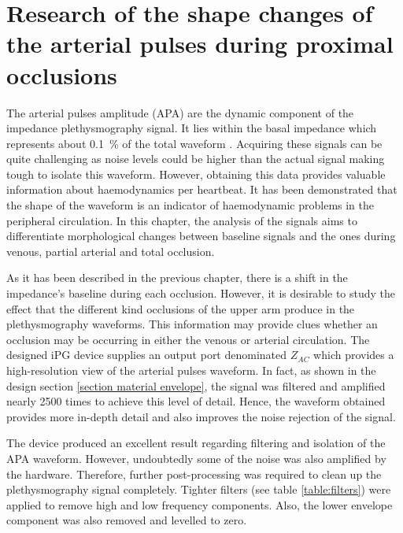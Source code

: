 
\chapter{Research of the shape changes of the arterial pulses during proximal occlusions}  %
\label{chapter apa}

\ifpdf
\graphicspath{{Chapter8/Figs/Raster/}{Chapter8/Figs/PDF/}{Chapter8/Figs/}}
\else
\graphicspath{{Chapter8/Figs/Vector/}{Chapter8/Figs/}}
\fi

The arterial pulses amplitude (APA) are the dynamic component of the impedance plethysmography signal. It lies within the basal impedance which represents about \SI{0.1}{\percent} of the total waveform \cite{anderson1984impedance}. Acquiring these signals can be quite challenging as noise levels could be higher than the actual signal making tough to isolate this waveform. However, obtaining this data provides valuable information about haemodynamics per heartbeat. It has been demonstrated that the shape of the waveform is an indicator of haemodynamic problems in the peripheral circulation. In this chapter, the analysis of the signals aims to differentiate morphological changes between baseline signals and the ones during venous, partial arterial and total occlusion.

As it has been described in the previous chapter, there is a shift in the impedance's baseline during each occlusion. However, it is desirable to study the effect that the different kind occlusions of the upper arm produce in the plethysmography waveforms.  This information may provide clues whether an occlusion may be occurring in either the venous or arterial circulation.  The designed iPG device supplies an output port denominated $Z_{AC}$  which provides a high-resolution view of the arterial pulses waveform.  In fact, as shown in the design section \ref{section material envelope}, the signal was filtered and amplified nearly 2500 times to achieve this level of detail. Hence, the waveform obtained provides more in-depth detail and also improves the noise rejection of the signal.

The device produced an excellent result regarding filtering and isolation of the APA waveform. However, undoubtedly some of the noise was also amplified by the hardware. Therefore, further post-processing was required to clean up the plethysmography signal completely. Tighter filters (see table \ref{table:filters}) were applied to remove high and low frequency components. Also, the lower envelope component was also removed and levelled to zero.

